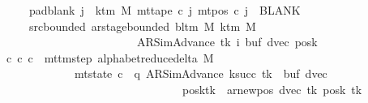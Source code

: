 \begin{isabellebody}
\ \ \ \ \ \ \ pad{\isacharunderscore}{\kern0pt}blank{\isacharcolon}{\kern0pt}\ {\isachardoublequoteopen}{\isasymforall}j\ {\isasymge}\ k{\isacharunderscore}{\kern0pt}tm\ M{\isachardot}{\kern0pt}\ mt{\isacharunderscore}{\kern0pt}tape\ c{\isacharprime}{\kern0pt}\ j\ {\isacharparenleft}{\kern0pt}mt{\isacharunderscore}{\kern0pt}pos\ c{\isacharprime}{\kern0pt}\ j{\isacharparenright}{\kern0pt}\ {\isacharequal}{\kern0pt}\ BLANK{}{\isachardoublequoteclose}\isanewline
\ \ \ \ \ \ \ src{\isacharunderscore}{\kern0pt}bounded{\isacharcolon}{\kern0pt}\ {\isachardoublequoteopen}ar{\isacharunderscore}{\kern0pt}stage{\isacharunderscore}{\kern0pt}bounded\ {\isacharparenleft}{\kern0pt}bl{\isacharunderscore}{\kern0pt}tm\ M{\isacharparenright}{\kern0pt}\ {\isacharparenleft}{\kern0pt}k{\isacharunderscore}{\kern0pt}tm\ M{\isacharparenright}{\kern0pt}\isanewline
\ \ \ \ \ \ \ \ \ \ \ \ \ \ \ \ \ \ \ \ \ \ \ \ \ \ {\isacharparenleft}{\kern0pt}AR{\isacharunderscore}{\kern0pt}SimAdvance{\isacharcomma}{\kern0pt}\ tk{\isacharcomma}{\kern0pt}\ i{\isacharcomma}{\kern0pt}\ buf{\isacharcomma}{\kern0pt}\ dvec{\isacharcomma}{\kern0pt}\ posk{\isacharparenright}{\kern0pt}{\isachardoublequoteclose}\isanewline
\ \ \ {\isachardoublequoteopen}{\isasymexists}c{\isacharprime}{\kern0pt}{\isacharprime}{\kern0pt}{\isachardot}{\kern0pt}\ {\isacharparenleft}{\kern0pt}c{\isacharprime}{\kern0pt}{\isacharcomma}{\kern0pt}\ c{\isacharprime}{\kern0pt}{\isacharprime}{\kern0pt}{\isacharparenright}{\kern0pt}\ {\isasymin}\ mttm{\isacharunderscore}{\kern0pt}step\ {\isacharparenleft}{\kern0pt}alphabet{\isacharunderscore}{\kern0pt}reduce{\isacharunderscore}{\kern0pt}delta\ M{\isacharparenright}{\kern0pt}\isanewline
\ \ \ \ \ \ \ \ \ \ \ \ \ \ {\isasymand}\ mt{\isacharunderscore}{\kern0pt}state\ c{\isacharprime}{\kern0pt}{\isacharprime}{\kern0pt}\ {\isacharequal}{\kern0pt}\ {\isacharparenleft}{\kern0pt}q{\isacharcomma}{\kern0pt}\ AR{\isacharunderscore}{\kern0pt}SimAdvance{\isacharcomma}{\kern0pt}\ k{\isacharunderscore}{\kern0pt}succ\ tk{\isacharcomma}{\kern0pt}\ {}{\isacharcomma}{\kern0pt}\ buf{\isacharcomma}{\kern0pt}\ dvec{\isacharcomma}{\kern0pt}\isanewline
\ \ \ \ \ \ \ \ \ \ \ \ \ \ \ \ \ \ \ \ \ \ \ \ \ \ \ \ \ \ \ \ \ \ posk{\isacharparenleft}{\kern0pt}tk\ {\isacharcolon}{\kern0pt}{\isacharequal}{\kern0pt}\ ar{\isacharunderscore}{\kern0pt}newpos\ {\isacharparenleft}{\kern0pt}dvec\ tk{\isacharparenright}{\kern0pt}\ {\isacharparenleft}{\kern0pt}posk\ tk{\isacharparenright}{\kern0pt}{\isacharparenright}{\kern0pt}{\isacharparenright}{\kern0pt}\isanewline

\end{isabellebody}
